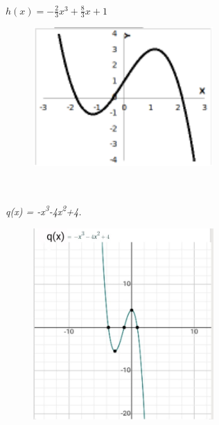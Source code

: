 \begin{respostas}{4}
~~

	\ansitem{} \( h \left( x \right) =-\frac{2}{3}x^{3}+\frac{8}{3}x+1 \) 

	\begin{figure}[H]
		\begin{Center}
			\includegraphics[width=2.71in,height=2.08in]{capitulos/outras_funcoes/media/image68.pdf}
		\end{Center}
	\end{figure}

~~

	\ansitem{} \textit{q(x) = -x\textsuperscript{3}-4x\textsuperscript{2}+4.}

	\begin{figure}[H]
		\begin{Center}
			\includegraphics[width=2.71in,height=2.87in]{capitulos/outras_funcoes/media/image69.jpeg}
		\end{Center}
	\end{figure}

\end{respostas}

